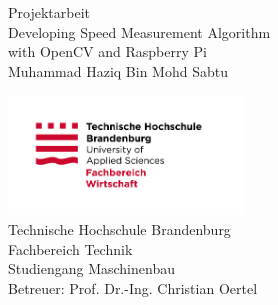 \begin{titlepage}
\begin{center}

\vspace*{20mm}
{\normalsize Projektarbeit}\\[2mm]
{\large \normalfont Developing Speed Measurement Algorithm\\[2mm]\small \normalfont with OpenCV and Raspberry Pi}
\\[5mm]

\large Muhammad Haziq Bin Mohd Sabtu

\vspace*{12mm}
\small


\vspace*{10mm}
\includegraphics[height=120px]{texs/pre/image/2015_10_05_THB_FB-W_Logo_RGB.jpg}\\
\small 
Technische Hochschule Brandenburg\\
Fachbereich Technik\\
Studiengang Maschinenbau\\
Betreuer: Prof. Dr.-Ing. Christian Oertel\\

\end{center}
\end{titlepage}